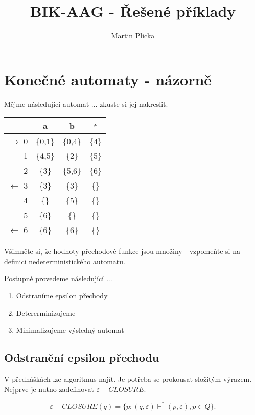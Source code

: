 \documentclass{article}
\begin{document}
\title{BIK-AAG - Řešené příklady}
\author{Martin Plicka}
\maketitle

\section{Konečné automaty - názorně}

Mějme následující automat ... zkuste si jej nakreslit.

\begin{tabular}{|r||c|c|c|}
\hline
             $ $     &   a      &    b       & $\epsilon$ \\
\hline
$\rightarrow$   0  & \{0,1\}  &   \{0,4\}  &  \{4\}   \\
                1  & \{4,5\}  &    \{2\}   &  \{5\}  \\
                2  & \{3\}    &   \{5,6\}  &  \{6\}  \\
$\leftarrow$    3  & \{3\}    &   \{3\}    &  \{\}   \\ 
                4  & \{\}     &   \{5\}    &  \{\}   \\
                5  & \{6\}    &   \{\}     &  \{\}   \\
$\leftarrow$    6  & \{6\}    &   \{6\}    &  \{\}   \\
\hline
\end{tabular}

Všimněte si, že hodnoty přechodové funkce jsou množiny - vzpomeňte si na definici nedeterministického automatu.

Postupně provedeme následující ...

\begin{enumerate}
\item Odstraníme epsilon přechody
\item Detererminizujeme
\item Minimalizujeme výsledný automat
\end{enumerate}


\subsection{Odstranění epsilon přechodu}

V přednáškách lze algoritmus najít. Je potřeba se prokousat složitým výrazem. Nejprve je nutno zadefinovat $\varepsilon - CLOSURE$.

$$\varepsilon-CLOSURE(q)=\{p:(q,\varepsilon)\vdash^*(p,\varepsilon), p\in Q\}.$$
\end{document}

